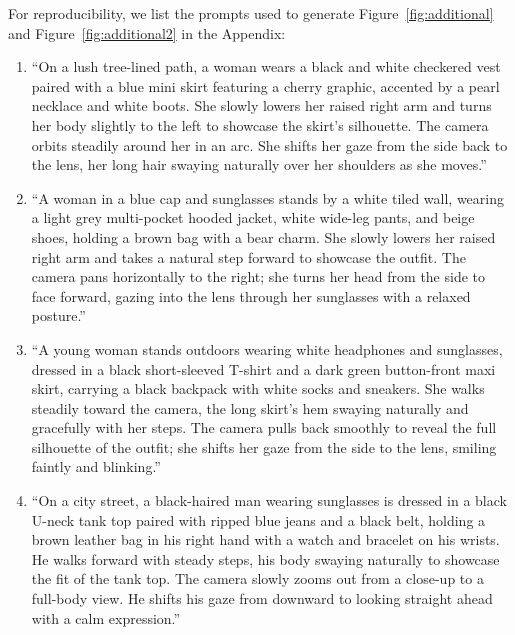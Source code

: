 \documentclass{llmxive}
\begin{document}
For reproducibility, we list the prompts used to generate Figure~\ref{fig:additional} and Figure~\ref{fig:additional2} in the Appendix:
\begin{enumerate}
\item ``On a lush tree-lined path, a woman wears a black and white checkered vest paired with a blue mini skirt featuring a cherry graphic, accented by a pearl necklace and white boots. She slowly lowers her raised right arm and turns her body slightly to the left to showcase the skirt's silhouette. The camera orbits steadily around her in an arc. She shifts her gaze from the side back to the lens, her long hair swaying naturally over her shoulders as she moves.''
% 
\item ``A woman in a blue cap and sunglasses stands by a white tiled wall, wearing a light grey multi-pocket hooded jacket, white wide-leg pants, and beige shoes, holding a brown bag with a bear charm. She slowly lowers her raised right arm and takes a natural step forward to showcase the outfit. The camera pans horizontally to the right; she turns her head from the side to face forward, gazing into the lens through her sunglasses with a relaxed posture.''
% 
\item ``A young woman stands outdoors wearing white headphones and sunglasses, dressed in a black short-sleeved T-shirt and a dark green button-front maxi skirt, carrying a black backpack with white socks and sneakers. She walks steadily toward the camera, the long skirt's hem swaying naturally and gracefully with her steps. The camera pulls back smoothly to reveal the full silhouette of the outfit; she shifts her gaze from the side to the lens, smiling faintly and blinking.''
% 
\item ``On a city street, a black-haired man wearing sunglasses is dressed in a black U-neck tank top paired with ripped blue jeans and a black belt, holding a brown leather bag in his right hand with a watch and bracelet on his wrists. He walks forward with steady steps, his body swaying naturally to showcase the fit of the tank top. The camera slowly zooms out from a close-up to a full-body view. He shifts his gaze from downward to looking straight ahead with a calm expression.''
\end{enumerate}
\end{document}
